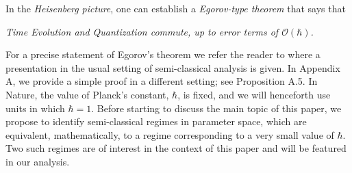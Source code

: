 \documentclass[12pt]{article}
\begin{document}
In the \textit{Heisenberg picture}, one can establish a \textit{Egorov-type theorem} that says that

\hspace{1.2cm} \textit{ Time Evolution and Quantization commute, up to error terms of $\mathcal{O}(\hbar)$.}

For a precise statement of Egorov's theorem we refer the reader to \cite{BR} where a presentation in the usual setting of semi-classical analysis is given. In Appendix A, we provide a simple proof in a different setting; see Proposition A.5.
In Nature, the value of Planck's constant, $\hbar$, is fixed, and we will henceforth use units in which $\hbar=1$.
Before starting to discuss the main topic of this paper, we propose to identify semi-classical regimes in parameter space,
which are equivalent, mathematically, to a regime corresponding to a very small value of $\hbar$.
Two such regimes are of interest in the context of this paper and will be featured in our analysis.
\end{document}
